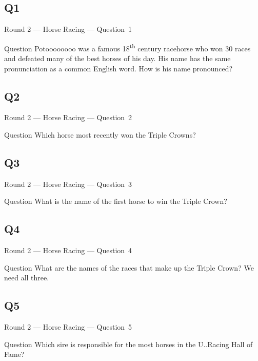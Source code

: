\documentclass[11pt]{beamer}
\begin{document}
\subsection*{Q1}
\begin{frame}[t]{Round 2 --- Horse Racing --- \mbox{Question 1}}
\vspace{-0.5em}
\begin{block}{Question}
Potoooooooo was a famous 18\textsuperscript{th} century racehorse who won 30 races and defeated many of the best horses of his day. His name has the same pronunciation as a common English word. How is his name pronounced?
\end{block}
\end{frame}
\subsection*{Q2}
\begin{frame}[t]{Round 2 --- Horse Racing --- \mbox{Question 2}}
\vspace{-0.5em}
\begin{block}{Question}
Which horse most recently won the Triple Crowns?
\end{block}
\end{frame}
\subsection*{Q3}
\begin{frame}[t]{Round 2 --- Horse Racing --- \mbox{Question 3}}
\vspace{-0.5em}
\begin{block}{Question}
What is the name of the first horse to win the Triple Crown?
\end{block}
\end{frame}
\subsection*{Q4}
\begin{frame}[t]{Round 2 --- Horse Racing --- \mbox{Question 4}}
\vspace{-0.5em}
\begin{block}{Question}
What are the names of the races that make up the Triple Crown? We need all three.
\end{block}
\end{frame}
\subsection*{Q5}
\begin{frame}[t]{Round 2 --- Horse Racing --- \mbox{Question 5}}
\vspace{-0.5em}
\begin{block}{Question}
Which sire is responsible for the most horses in the U.\@S.\@ Racing Hall of Fame?
\end{block}
\end{frame}
\end{document}
